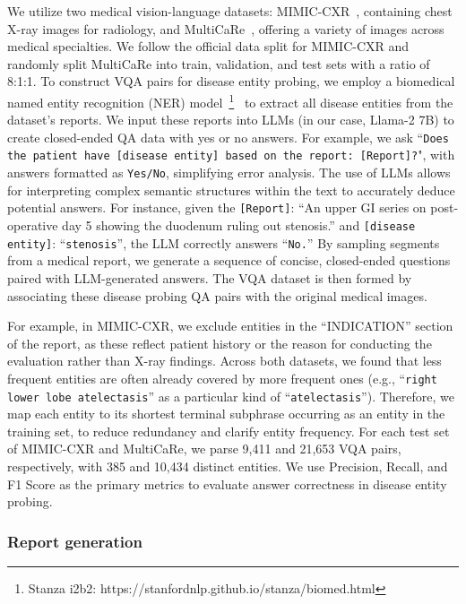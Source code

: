 We utilize two medical vision-language datasets: MIMIC-CXR~\cite{Johnson2019MIMICCXRAD}, containing chest X-ray images for radiology, and MultiCaRe~\cite{multicaredataset}, offering a variety of images across medical specialties.
We follow the official data split for MIMIC-CXR and randomly split MultiCaRe into train, validation, and test sets with a ratio of 8:1:1.
To construct VQA pairs for disease entity probing, we employ a biomedical named entity recognition (NER) model~\footnote{Stanza i2b2: https://stanfordnlp.github.io/stanza/biomed.html }~\cite{zhang2021biomedical} to extract all disease entities from the dataset's reports. 
We input these reports into LLMs (in our case, Llama-2 7B) to create closed-ended QA data with yes or no answers. 
For example, we ask ``\texttt{Does the patient have [disease entity] based on the report: [Report]?}", with answers formatted as \texttt{Yes/No}, simplifying error analysis. 
The use of LLMs allows for interpreting complex semantic structures within the text to accurately deduce potential answers. 
For instance, given the \texttt{[Report]}: ``An upper GI series on post-operative day 5 showing the duodenum ruling out stenosis.'' and \texttt{[disease entity]}: ``\texttt{stenosis}'', the LLM correctly answers ``\texttt{No.}''
By sampling segments from a medical report, we generate a sequence of concise, closed-ended questions paired with LLM-generated answers. The VQA dataset is then formed by associating these disease probing QA pairs with the original medical images.

For example, in MIMIC-CXR, we exclude entities in the ``INDICATION'' section of the report, as these reflect patient history or the reason for conducting the evaluation rather than X-ray findings.
Across both datasets, we found that less frequent entities are often already covered by more frequent ones (e.g., ``\texttt{right lower lobe atelectasis}'' as a particular kind of ``\texttt{atelectasis}''). Therefore, we map each entity to its shortest terminal subphrase occurring as an entity in the training set, to reduce redundancy and clarify entity frequency. 
For each test set of MIMIC-CXR and MultiCaRe, we parse 9,411 and 21,653 VQA pairs, respectively, with 385 and 10,434 distinct entities.
We use Precision, Recall, and F1 Score as the primary metrics to evaluate answer correctness in disease entity probing.

\subsubsection{Report generation}


